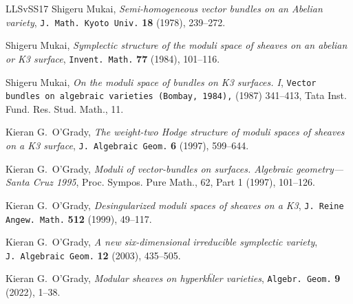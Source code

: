 \documentclass[11pt]{amsart}
\theoremstyle{definition}
\theoremstyle{remark}
\begin{document}
\begin{thebibliography}{LLSvSS17}
 Shigeru Mukai, \emph{Semi-homogeneous vector bundles on an Abelian variety\/}, 
{\tt   J.~Math.~Kyoto Univ.} {\bf 18} (1978),  239--272. 


 Shigeru Mukai, 
\emph{Symplectic structure of the moduli space of sheaves on an abelian or K3 surface\/}, 
{\tt Invent.~Math.} {\bf   77} (1984), 101--116.

 Shigeru Mukai, 
\emph{On the moduli space of bundles on K3 surfaces. I\/}, 
{\tt Vector bundles on algebraic varieties (Bombay, 1984),} (1987) 341--413,
Tata Inst. Fund. Res. Stud. Math., 11.





%
%
%
%
%
%
%

 Kieran G.~O'Grady, \emph{The weight-two Hodge structure of 
moduli spaces of sheaves on a K3 surface\/},  
{\tt  J.~Algebraic Geom.} {\bf   6} (1997), 599--644.

 Kieran G.~O'Grady, \emph{Moduli of vector-bundles on surfaces. Algebraic geometry—Santa Cruz 1995\/},   
Proc. Sympos. Pure Math., 62, Part 1 (1997), 101--126.


 Kieran G.~O'Grady, \emph{Desingularized moduli spaces of sheaves on a K3\/},  
{\tt  J.~Reine Angew.~Math.} {\bf  512} (1999), 49--117.

 Kieran G.~O'Grady, \emph{A new six-dimensional irreducible symplectic variety\/},  
{\tt  J.~Algebraic Geom.} {\bf  12} (2003),  435--505.


 Kieran G.~O'Grady, \emph{Modular sheaves on hyperk\"hler varieties\/},  
{\tt Algebr.~Geom.} {\bf   9} (2022),  1--38.


\end{thebibliography}
\end{document}

